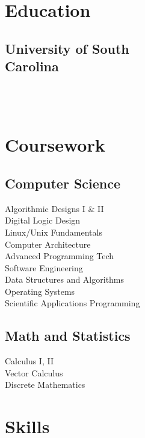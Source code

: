 \documentclass[letterpaper]{deedy-resume}
\begin{document}
\begin{minipage}[t]{0.29\textwidth} 

\section{Education} 

\subsection{University of South \\Carolina}

 \\
 \\

\sectionspace 

\section{Coursework}

\subsection{Computer Science}
Algorithmic Designs I \& II \\
Digital Logic Design \\
Linux/Unix Fundamentals \\
Computer Architecture \\
Advanced Programming Tech \\
Software Engineering \\
Data Structures and Algorithms \\
Operating Systems \\
Scientific Applications Programming \\

\sectionspace
\subsection{Math and Statistics}
Calculus I, II \\
Vector Calculus \\
Discrete Mathematics \\



\sectionspace

\section{Skills}


\end{minipage}
\end{document}

